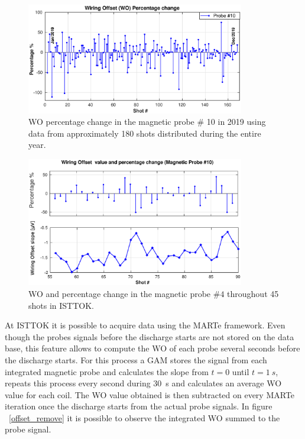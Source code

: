 \begin{figure}[htbp]
	\centering
	\includegraphics[width=0.85\textwidth]{Chp4/percentage_change.eps}
	\caption{\label{WO_percent} WO percentage change in the magnetic probe $\#$ 10  in 2019 using data from approximately  180 shots distributed during the entire year. }
\end{figure}

\begin{figure}[htbp]
	\centering
	\includegraphics[width=0.85\textwidth]{Chp4/valueAndpercentage_change10.eps}
	\caption{\label{WO_minr10} WO and percentage change in the magnetic probe $\#4$  throughout 45 shots in ISTTOK.}
\end{figure}

 At ISTTOK it is possible to acquire data using the MARTe framework. Even though the probes signals before the discharge starts are not  stored on the data base, this feature allows to compute the WO of each probe several seconds before the discharge starts. For this process a GAM stores the signal from each integrated magnetic probe and calculates the slope from $t=0$ until $t=1~s$, repeats this process every second during  30~s and calculates an average WO value for each coil. The WO  value obtained  is then subtracted on every MARTe iteration once the discharge starts from the actual probe signals.   In  figure ~\ref{offset_remove} it is possible to observe the integrated WO summed to the probe signal.  \smallskip

